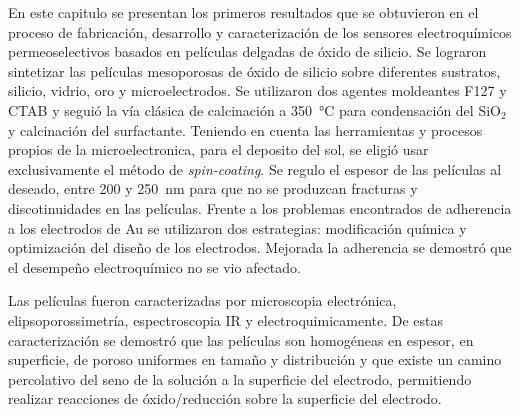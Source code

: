En este capitulo se presentan los primeros resultados que se obtuvieron en el proceso de fabricación, desarrollo y caracterización de los sensores electroquímicos permeoselectivos basados en películas delgadas de óxido de silicio. Se lograron sintetizar las películas mesoporosas de óxido de silicio sobre diferentes sustratos, silicio, vidrio, oro y microelectrodos. Se utilizaron dos agentes moldeantes F127 y CTAB y seguió la vía clásica de calcinación a \SI{350}{\celsius} para condensación del SiO$_2$ y calcinación del surfactante. Teniendo en cuenta las herramientas y procesos propios de la microelectronica, para el deposito del sol, se eligió usar exclusivamente el método de \textit{spin-coating}. Se regulo el espesor de las películas al deseado, entre 200 y \SI{250}{\nm} para que no se produzcan fracturas y discotinuidades en las películas. Frente a los problemas encontrados de adherencia a los electrodos de Au se utilizaron dos estrategias: modificación química y optimización del diseño de los electrodos. Mejorada la adherencia se demostró que el desempeño electroquímico no se vio afectado. 

Las películas fueron caracterizadas por microscopia electrónica, elipsoporossimetría, espectroscopia IR y electroquimicamente. De estas caracterización se demostró que las películas son homogéneas en espesor, en superficie, de poroso uniformes en tamaño y distribución y que existe un camino percolativo del seno de la solución a la superficie del electrodo, permitiendo realizar reacciones de óxido/reducción sobre la superficie del electrodo.


